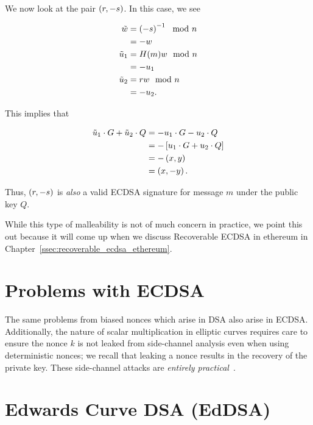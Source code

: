 We now look at the pair $\left( r,-s \right)$.
In this case, we see

\begin{align}
    \tilde{w} &= \left( -s \right)^{-1} \mod n
            \nonumber\\
        &= -w \nonumber\\
    \tilde{u}_{1} &= H(m)w \mod n
            \nonumber\\
        &= -u_{1} \nonumber\\
    \tilde{u}_{2} &= rw \mod n
            \nonumber\\
        &= -u_{2}.
\end{align}

\noindent
This implies that

\begin{align}
    \tilde{u}_{1}\cdot G + \tilde{u}_{2}\cdot Q
            &= -u_{1}\cdot G - u_{2}\cdot Q
        \nonumber\\
    &= -\left[ u_{1}\cdot G + u_{2}\cdot Q \right]
        \nonumber\\
    &= -\left( x,y \right) \nonumber\\
    &= \left( x,-y \right).
\end{align}

\noindent
Thus, $\left( r,-s \right)$ is \emph{also} a valid ECDSA signature 
for message $m$ under the public key $Q$.

While this type of malleability is not of much concern in practice,
we point this out because it will come up when we discuss
Recoverable ECDSA in \gls{ethereum} in
Chapter~\ref{ssec:recoverable_ecdsa_ethereum}.



\section{Problems with ECDSA}

The same problems from biased \glspl{nonce} which arise in DSA
also arise in ECDSA.
Additionally, the nature of scalar multiplication
in \glspl{elliptic curve} requires care to ensure the \gls{nonce} $k$
is not leaked from side-channel analysis
even when using deterministic \glspl{nonce};
we recall that leaking a \gls{nonce} results in the recovery
of the private key.
These side-channel attacks are
\emph{entirely
practical}~\cite{jancar2020minerva,weiser2020big,brumley2011remote}.



\section{Edwards Curve DSA (EdDSA)}


